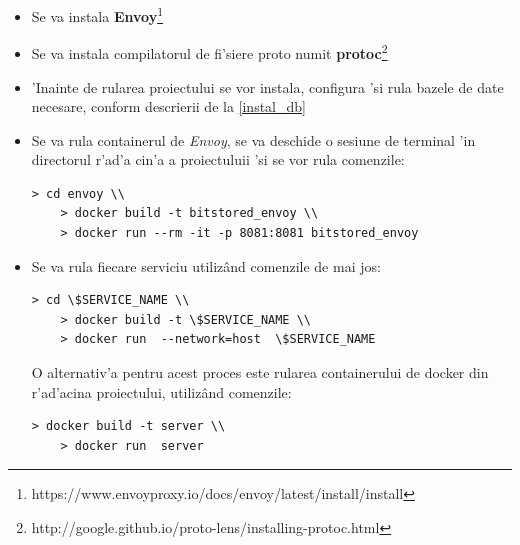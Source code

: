 \documentclass[12pt,a4paper,twoside]{report}
\begin{document}
\begin{enumerate}[label=Pasul \arabic*]
{\begin{itemize}
\item{Se va instala  \textbf{Envoy}\footnote{https://www.envoyproxy.io/docs/envoy/latest/install/install}}
\item{Se va instala compilatorul de fi'siere proto numit \textbf{protoc}\footnote{http://google.github.io/proto-lens/installing-protoc.html}}
\item{ 'Inainte de rularea proiectului se vor instala, configura 'si rula  bazele de date necesare, conform descrierii de la \ref{instal_db}}
\item{ Se va rula containerul de \textit{Envoy}, se va deschide o sesiune de terminal 'in directorul r'ad'a cin'a a proiectuluii 'si se vor rula comenzile:
\begin{tcolorbox}\label{run_envoy}
    \scriptsize{
    \begin{Verbatim}[commandchars=\\\{\}]
	> cd envoy \\
	> docker build -t bitstored_envoy \\
	> docker run --rm -it -p 8081:8081 bitstored_envoy
    \end{Verbatim}
    }
    \end{tcolorbox} }
\item{Se va rula fiecare serviciu utilizând comenzile de mai jos:
\begin{tcolorbox}\label{run_services}
    \scriptsize{
    \begin{Verbatim}[commandchars=\\\{\}]
	> cd \$SERVICE_NAME \\
	> docker build -t \$SERVICE_NAME \\
	> docker run  --network=host  \$SERVICE_NAME
    \end{Verbatim}
    }
    \end{tcolorbox} 
  O alternativ'a pentru acest proces este rularea containerului de docker din r'ad'acina proiectului, utilizând comenzile:
  \begin{tcolorbox}\label{run_server}
    \scriptsize{
    \begin{Verbatim}[commandchars=\\\{\}]
	> docker build -t server \\
	> docker run  server
    \end{Verbatim}
    }
    \end{tcolorbox} 
}
\end{itemize}
}


\end{enumerate}
\end{document}
